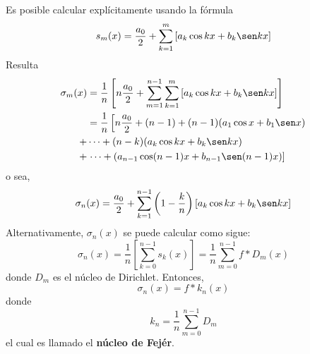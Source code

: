 \documentclass[12pt]{report}
\newcounter{it}
\theoremstyle{largebreak}
\begin{document}
    Es posible calcular explícitamente usando la fórmula
    \begin{equation*}
        s_m(x)=\frac{a_0}{2}+\sum_{ k=1}^{m}\left[a_k\cos kx+b_k\sen kx \right]
    \end{equation*}
    Resulta
    \begin{equation*}
        \begin{split}
            \sigma_m(x)&=\frac{1}{n}\left[n\frac{a_0}{2}+\sum_{m=1}^{ n-1}\sum_{ k=1}^{m}\left[a_k\cos kx+b_k\sen kx \right] \right]\\
            &=\frac{1}{n}\left[n\frac{a_0}{2}+(n-1)+(n-1)(a_1\cos x+b_1\sen x)\right.\\
            +&\cdots+(n-k)(a_k\cos kx+b_k\sen kx)\\
            +&\left. \cdots+(a_{ n-1}\cos (n-1)x+b_{ n-1}\sen(n-1)x)\right] \\
        \end{split}
    \end{equation*}
    o sea,
    \begin{equation*}
        \sigma_n(x)=\frac{a_0}{2}+\sum_{ k=1}^{n-1}\left(1-\frac{k}{n} \right)\left[a_k\cos kx+b_k\sen kx \right]
    \end{equation*}
    Alternativamente, $\sigma_n(x)$ se puede calcular como sigue:
    \begin{equation*}
        \sigma_n(x)=\frac{1}{n}\left[\sum_{ k=0}^{ n-1}s_k(x) \right]=\frac{1}{n}\sum_{ m=0}^{ n-1}f*D_m(x)
    \end{equation*}
    donde $D_m$ es el núcleo de Dirichlet. Entonces,
    \begin{equation*}
        \sigma_n(x)=f*k_n(x)
    \end{equation*}
    donde
    \begin{equation*}
        k_n=\frac{1}{n}\sum_{ m=0}^{ n-1}D_m
    \end{equation*}
    el cual es llamado el \textbf{núcleo de Fejér}.
\end{document}
